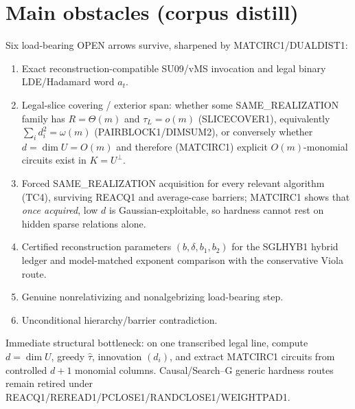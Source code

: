 \documentclass[11pt]{article}
\begin{document}
\section*{Main obstacles (corpus distill)}
Six load-bearing OPEN arrows survive, sharpened by MATCIRC1/DUALDIST1:
\begin{enumerate}
\item Exact reconstruction-compatible SU09/vMS invocation and legal binary LDE/Hadamard word $a_t$.
\item Legal-slice covering / exterior span: whether some SAME\_REALIZATION family has
$R=\Theta(m)$ and $\tau_L=o(m)$ (SLICECOVER1), equivalently $\sum_i d_i^2=\omega(m)$
(PAIRBLOCK1/DIMSUM2), or conversely whether $d=\dim U=O(m)$ and therefore (MATCIRC1)
explicit $O(m)$-monomial circuits exist in $K=U^\perp$.
\item Forced SAME\_REALIZATION acquisition for every relevant algorithm (TC4), surviving
REACQ1 and average-case barriers; MATCIRC1 shows that \emph{once acquired}, low $d$ is
Gaussian-exploitable, so hardness cannot rest on hidden sparse relations alone.
\item Certified reconstruction parameters $(b,\delta,b_1,b_2)$ for the SGLHYB1 hybrid ledger
and model-matched exponent comparison with the conservative Viola route.
\item Genuine nonrelativizing and nonalgebrizing load-bearing step.
\item Unconditional hierarchy/barrier contradiction.
\end{enumerate}
Immediate structural bottleneck: on one transcribed legal line, compute $d=\dim U$,
greedy $\widehat\tau$, innovation $(d_i)$, and extract MATCIRC1 circuits from controlled
$d+1$ monomial columns. Causal/Search--G generic hardness routes remain retired under
REACQ1/REREAD1/PCLOSE1/RANDCLOSE1/WEIGHTPAD1.
\end{document}
